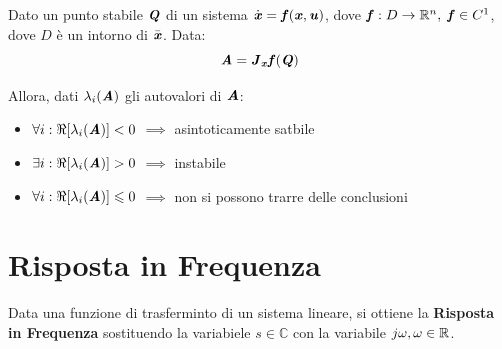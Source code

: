 \documentclass[12pt]{article}
\begin{document}
Dato un punto stabile $\textbf{\textit{Q}}$ di un sistema $\dot{\textbf{\textit{x}}} = \textbf{\textit{f}}(\textbf{\textit{x}}, \textbf{\textit{u}})$, dove $\textbf{\textit{f}}: D \to \mathbb{R}^{n}, \;\textbf{\textit{f}}\in C^{1} $, dove $D$ \`e un intorno di $\bar{\textbf{\textit{x}}}$. Data:
\[ \textbf{\textit{A}} = \textbf{\textit{J}}_{\textbf{\textit{x}}}\textbf{\textit{f}}(\textbf{\textit{Q}}) \]

Allora, dati $\lambda_i(\textbf{\textit{A}})$ gli autovalori di $\textbf{\textit{A}}$:
\begin{itemize}
    \item $\forall i: \Re[\lambda_i(\textbf{\textit{A}})] < 0$ $ \implies$ asintoticamente satbile
    \item $\exists i: \Re[\lambda_i(\textbf{\textit{A}})] > 0$ $ \implies$ instabile
    \item $\forall i: \Re[\lambda_i(\textbf{\textit{A}})] \leqslant 0$ $ \implies$ non si possono trarre delle conclusioni
\end{itemize}



\newpage
\section{Risposta in Frequenza}
Data una funzione di trasferminto di un sistema lineare, si ottiene la \textbf{Risposta in Frequenza} sostituendo la variabiele $s\in \mathbb{C}$ con la variabile $j\omega, \omega\in\mathbb{R}$.
\end{document}
